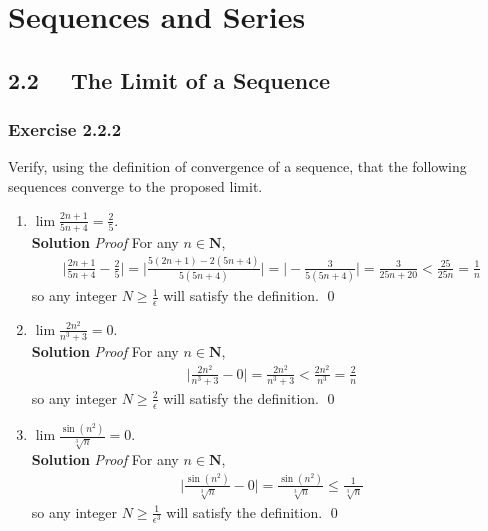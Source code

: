 \documentclass[12pt]{report}
\begin{document}
\chapter{Sequences and Series}
\section{2.2 ~~The Limit of a Sequence}
\subsection*{Exercise 2.2.2}
Verify, using the definition of convergence of a sequence, that the following sequences converge to the proposed limit.
\begin{enumerate}[label=(\alph*)]
    \item $\lim \frac{2n+1}{5n+4}=\frac{2}{5}$.\\
    \textbf{Solution} \textit{Proof} For any $n \in \mathbf{N}$,
    \begin{align*}
        \bigg| \frac{2n+1}{5n+4}-\frac{2}{5}\bigg| = \bigg|\frac{5(2n+1)-2(5n+4)}{5(5n+4)}\bigg| = \bigg|-\frac{3}{5(5n+4)}\bigg|=\frac{3}{25n+20}<\frac{25}{25n}=\frac{1}{n}
    \end{align*}
    so any integer $N \geq \frac{1}{\epsilon}$ will satisfy the definition. \qed
    \item $\lim \frac{2 n^2}{n^3+3}=0$.\\
    \textbf{Solution} \textit{Proof} For any $n \in \mathbf{N}$,
    \begin{align*}
        \bigg| \frac{2n^2}{n^3+3}-0\bigg| = \frac{2n^2}{n^3+3} <\frac{2n^2}{n^3}=\frac{2}{n}
    \end{align*}
    so any integer $N \geq \frac{2}{\epsilon}$ will satisfy the definition. \qed
    \item $\lim \frac{\sin \left(n^2\right)}{\sqrt[3]{n}}=0$.\\
    \textbf{Solution} \textit{Proof} For any $n \in \mathbf{N}$,
    \begin{align*}
        \bigg| \frac{\sin \left(n^2\right)}{\sqrt[3]{n}}-0\bigg| = \frac{\sin \left(n^2\right)}{\sqrt[3]{n}} \leq\frac{1}{\sqrt[3]{n}}
    \end{align*}
    so any integer $N \geq \frac{1}{\epsilon^3}$ will satisfy the definition. \qed
\end{enumerate}
\end{document}
